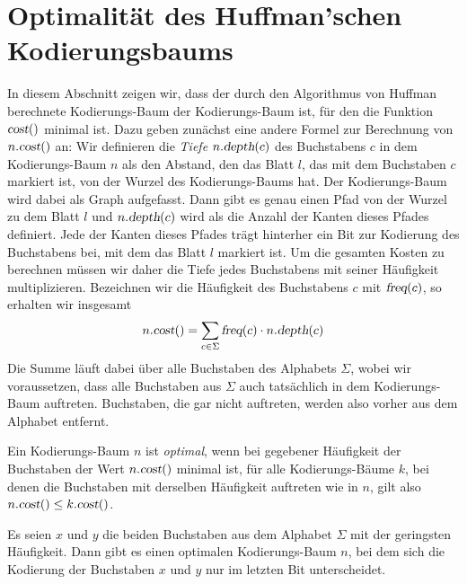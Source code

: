 \section{Optimalit\"at des Huffman'schen Kodierungsbaums}
In diesem Abschnitt zeigen wir, dass der durch den Algorithmus von Huffman berechnete Kodie\-rungs-Baum der
Kodierungs-Baum ist, f\"ur den die Funktion $\textsl{cost}()$ minimal ist.  Dazu geben zun\"achst eine andere
Formel zur Berechnung von $n.\textsl{cost}()$ an:  Wir definieren die \emph{Tiefe}
$n.\textsl{depth}(c)$ des Buchstabens $c$ in dem Kodierungs-Baum $n$ als den Abstand, den das Blatt $l$,
das mit dem Buchstaben $c$ markiert ist, von der Wurzel des Kodierungs-Baums hat.  Der Kodierungs-Baum
wird dabei als Graph aufgefasst.  Dann gibt es genau einen Pfad von der Wurzel zu dem Blatt $l$ und 
$n.\textsl{depth}(c)$ wird als die Anzahl der Kanten dieses Pfades definiert.
Jede der Kanten dieses Pfades tr\"agt hinterher ein Bit zur 
Kodierung des Buchstabens bei, mit dem das Blatt $l$ markiert ist.  Um die gesamten Kosten zu berechnen
m\"ussen wir daher die Tiefe jedes Buchstabens mit seiner H\"aufigkeit multiplizieren.  Bezeichnen wir die
H\"aufigkeit des Buchstabens $c$ mit $\textsl{freq}(c)$, so erhalten wir insgesamt
\begin{equation}
  \label{eq:cost}
  n.\textsl{cost}() = \sum\limits_{c\in\Sigma} \textsl{freq}(c) \cdot n.\textsl{depth}(c)
\end{equation}
Die Summe l\"auft dabei \"uber alle Buchstaben des Alphabets $\Sigma$, wobei wir voraussetzen,
dass alle Buchstaben aus $\Sigma$ auch tats\"achlich in dem Kodierungs-Baum auftreten.
Buchstaben, die gar nicht auftreten, werden also vorher aus dem Alphabet entfernt.

\begin{Definition}
  Ein Kodierungs-Baum $n$ ist \emph{optimal}, wenn bei gegebener H\"aufigkeit der Buchstaben
  der Wert $n.\textsl{cost}()$ minimal ist, f\"ur alle Kodierungs-B\"aume $k$, bei denen die
  Buchstaben mit derselben H\"aufigkeit auftreten wie in $n$,  gilt also
  \\[0.2cm]
  \hspace*{1.3cm} $n.\textsl{cost}() \leq k.\textsl{cost}()$.
\end{Definition}


\begin{Lemma}
  \label{huffman:l1}
  Es seien $x$ und $y$ die beiden Buchstaben aus dem Alphabet $\Sigma$ mit der geringsten H\"aufigkeit.  Dann
  gibt es einen optimalen Kodierungs-Baum $n$, bei dem sich die Kodierung der Buchstaben $x$ und $y$ nur im
  letzten Bit unterscheidet.
\end{Lemma}

